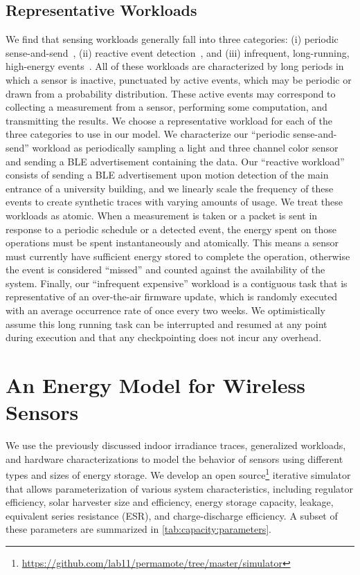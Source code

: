 
\subsection{Representative Workloads}
We find that sensing workloads generally fall into three
categories: (i) periodic sense-and-send~\cite{mainwaring2002wireless}, (ii) reactive event detection~\cite{campbellEnergy14,afanasov2020battery}, and (iii) infrequent,
long-running, high-energy events~\cite{levis2004trickle}. 
All of these workloads are characterized by long periods in which a sensor is inactive, punctuated by active events, which may be periodic or drawn from a probability distribution.
These active events may correspond to collecting a measurement from a sensor, performing some computation, and transmitting the results.
We choose a representative workload for each
of the three categories to use in our model.
We characterize our ``periodic sense-and-send''
workload as periodically sampling a light and three channel color sensor and sending a
BLE advertisement containing the data.
Our ``reactive workload'' consists of sending a BLE advertisement upon motion detection of the main
entrance of a university building, and we linearly scale the frequency
of these events to create synthetic traces with varying amounts of usage. 
We treat these workloads as atomic. 
When a measurement is taken or a packet is sent in response to a periodic schedule or a detected event, the energy spent on those operations must be spent instantaneously and atomically. 
This means a sensor must currently have sufficient energy stored to complete the operation, otherwise the event is considered ``missed'' and counted against the availability of the system.
Finally, our ``infrequent expensive'' workload is a
contiguous
task that is representative of an
over-the-air firmware update, which is randomly executed with an average occurrence rate
of once every two weeks.
We optimistically assume this long running task can be interrupted
and resumed at any point during execution and that any checkpointing does not incur any overhead.


\section{An Energy Model for Wireless Sensors}
We use the previously discussed indoor irradiance traces, generalized
workloads, and hardware characterizations to model the behavior of sensors
using different types and sizes of energy storage. We develop an open
source\footnote{\url{https://github.com/lab11/permamote/tree/master/simulator}}
iterative simulator that allows parameterization of various system
characteristics, including regulator efficiency, solar harvester size
and efficiency, energy storage capacity, leakage, equivalent series resistance (ESR), and charge-discharge
efficiency. A subset of these parameters are summarized in \cref{tab:capacity:parameters}.

